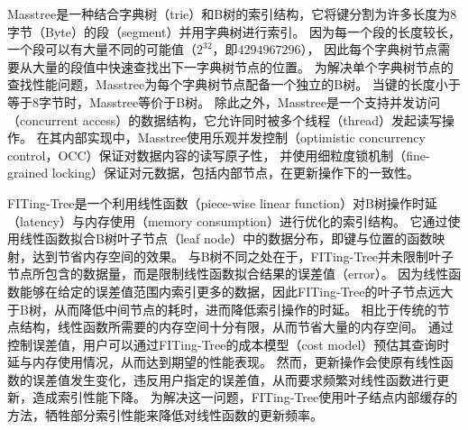 Masstree\cite{mao2012cache}是一种结合字典树（trie）和B树的索引结构，它将键分割为许多长度为8字节（Byte）的段（segment）并用字典树进行索引。
因为每一个段的长度较长，一个段可以有大量不同的可能值（$2^32$，即$4294967296$），
因此每个字典树节点需要从大量的段值中快速查找出下一字典树节点的位置。
为解决单个字典树节点的查找性能问题，Masstree为每个字典树节点配备一个独立的B树。
当键的长度小于等于8字节时，Masstree等价于B树。
除此之外，Masstree是一个支持并发访问（concurrent access）的数据结构，它允许同时被多个线程（thread）发起读写操作。
在其内部实现中，Masstree使用乐观并发控制（optimistic concurrency control，OCC）保证对数据内容的读写原子性，
并使用细粒度锁机制（fine-grained locking）保证对元数据，包括内部节点，在更新操作下的一致性。


FITing-Tree\cite{fittingtree}是一个利用线性函数（piece-wise linear function）对B树操作时延（latency）与内存使用（memory consumption）进行优化的索引结构。
它通过使用线性函数拟合B树叶子节点（leaf node）中的数据分布，即键与位置的函数映射，达到节省内存空间的效果。
与B树不同之处在于，FITing-Tree并未限制叶子节点所包含的数据量，而是限制线性函数拟合结果的误差值（error）。
因为线性函数能够在给定的误差值范围内索引更多的数据，因此FITing-Tree的叶子节点远大于B树，从而降低中间节点的耗时，进而降低索引操作的时延。
相比于传统的节点结构，线性函数所需要的内存空间十分有限，从而节省大量的内存空间。
通过控制误差值，用户可以通过FITing-Tree的成本模型（cost model）预估其查询时延与内存使用情况，从而达到期望的性能表现。
然而，更新操作会使原有线性函数的误差值发生变化，违反用户指定的误差值，从而要求频繁对线性函数进行更新，造成索引性能下降。
为解决这一问题，FITing-Tree使用叶子结点内部缓存的方法，牺牲部分索引性能来降低对线性函数的更新频率。


